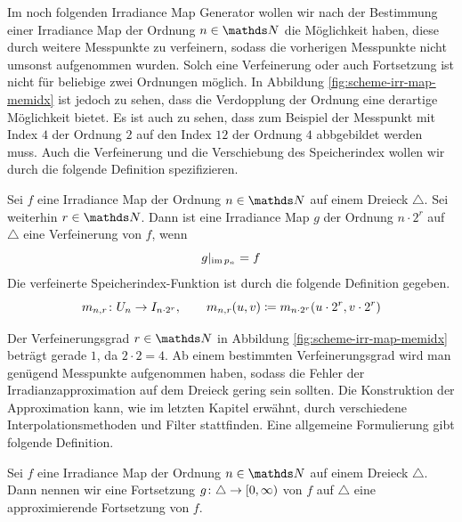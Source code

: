 		Im noch folgenden Irradiance Map Generator wollen wir nach der Bestimmung einer Irradiance Map der Ordnung $n\in\SN$ die Möglichkeit haben, diese durch weitere Messpunkte zu verfeinern, sodass die vorherigen Messpunkte nicht umsonst aufgenommen wurden.
		Solch eine Verfeinerung oder auch Fortsetzung ist nicht für beliebige zwei Ordnungen möglich.
		In Abbildung \ref{fig:scheme-irr-map-memidx} ist jedoch zu sehen, dass die Verdopplung der Ordnung eine derartige Möglichkeit bietet.
		Es ist auch zu sehen, dass zum Beispiel der Messpunkt mit Index $4$ der Ordnung $2$ auf den Index $12$ der Ordnung $4$ abbgebildet werden muss.
		Auch die Verfeinerung und die Verschiebung des Speicherindex wollen wir durch die folgende Definition spezifizieren.
		\begin{definition}
			Sei $f$ eine Irradiance Map der Ordnung $n\in\SN$ auf einem Dreieck $\triangle$.
			Sei weiterhin $r\in\SN$.
			Dann ist eine Irradiance Map $g$ der Ordnung $n\cdot 2^r$ auf $\triangle$ eine Verfeinerung von $f$, wenn
			\[
				g\vert_{\operatorname{im} p_n} = f
			\]
			Die verfeinerte Speicherindex-Funktion ist durch die folgende Definition gegeben.
			\[
				m_{n,r}\colon U_n\to I_{n\cdot 2^r},\qquad m_{n,r}(u,v)\coloneqq m_{n\cdot 2^r}(u\cdot 2^r,v\cdot 2^r)
			\]
		\end{definition}

		Der Verfeinerungsgrad $r\in\SN$ in Abbildung \ref{fig:scheme-irr-map-memidx} beträgt gerade $1$, da $2\cdot 2 = 4$.
		Ab einem bestimmten Verfeinerungsgrad wird man genügend Messpunkte aufgenommen haben, sodass die Fehler der Irradianzapproximation auf dem Dreieck gering sein sollten.
		Die Konstruktion der Approximation kann, wie im letzten Kapitel erwähnt, durch verschiedene Interpolationsmethoden und Filter stattfinden.
		Eine allgemeine Formulierung gibt folgende Definition.
		\begin{definition}
			Sei $f$ eine Irradiance Map der Ordnung $n\in\SN$ auf einem Dreieck $\triangle$.
			Dann nennen wir eine Fortsetzung $g\colon\triangle\to[0,\infty)$ von $f$ auf $\triangle$ eine approximierende Fortsetzung von $f$.
		\end{definition}

